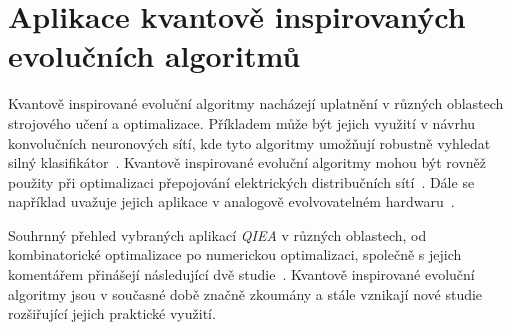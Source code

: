 \section{Aplikace kvantově inspirovaných evolučních algoritmů}
Kvantově inspirované evoluční algoritmy nacházejí uplatnění v různých oblastech strojového učení a optimalizace. 
Příkladem může být jejich využití v návrhu konvolučních neuronových sítí, kde tyto algoritmy umožňují robustně vyhledat silný klasifikátor~\cite{QIEA-CNN}. 
Kvantově inspirované evoluční algoritmy mohou být rovněž použity při optimalizaci přepojování elektrických distribučních sítí~\cite{QIEA-net}. 
Dále se například uvažuje jejich aplikace v analogově evolvovatelném hardwaru~\cite{QIEA-EHW}. 

Souhrnný přehled vybraných aplikací \emph{QIEA} v různých oblastech, od kombinatorické optimalizace po numerickou optimalizaci, společně s jejich komentářem přinášejí následující dvě studie~\cite{QIEA-survey1, QIEA-survey2}. 
Kvantově inspirované evoluční algoritmy jsou v současné době značně zkoumány a stále vznikají nové studie rozšiřující jejich praktické využití. 
